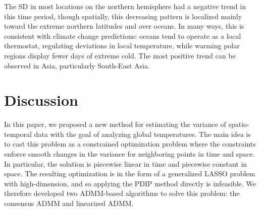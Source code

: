 \documentclass[letterpaper]{article} %
\newcommand{\autoref}{\Cref}
\begin{document}
The SD in most locations on the northern
hemisphere had a negative trend in this time period, though spatially,
this decreasing pattern is localized mainly toward the extreme
northern latitudes and over oceans. In many ways, this is consistent
with climate change predictions: oceans tend to operate as a local
thermostat, regulating deviations in local temperature, while warming polar
regions display fewer days of extreme cold.
The most positive trend can be observed in Asia,
particularly South-East Asia. 





\section{Discussion}
\label{sec:discussion}

In this paper, we proposed a new method for estimating the variance of
spatio-temporal data with the goal of analyzing global
temperatures. The main idea is to cast this problem as a 
constrained optimization problem where the constraints enforce smooth
changes in the variance for neighboring points in time and space. In
particular, the solution is piecewise linear in time and piecewise
constant in space. The resulting optimization is in the form of a
generalized LASSO problem with high-dimension, and so applying the
PDIP method directly is infeasible. We therefore developed two
ADMM-based algorithms to solve this problem: the consensus ADMM and
linearized ADMM. 
\end{document}
